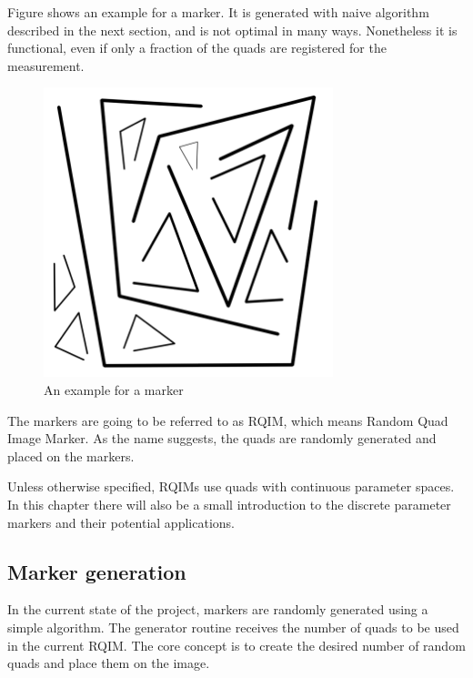 Figure  shows an example for a marker.
It is generated with naive algorithm described in the next section, and is not optimal in many ways.
Nonetheless it is functional, even if only a fraction of the quads are registered for the measurement.
\begin{figure}[ht]
	\centering
	\includegraphics[width=0.75\textwidth]{figures/RQIM_1.png}
	\caption{An example for a marker}
	\label{fig:rqimExample}
\end{figure}

The markers are going to be referred to as RQIM, which means Random Quad Image Marker.
As the name suggests, the quads are randomly generated and placed on the markers.

Unless otherwise specified, RQIMs use quads with continuous parameter spaces.
In this chapter there will also be a small introduction to the discrete parameter markers and their potential applications.

\subsection{Marker generation}

In the current state of the project, markers are randomly generated using a simple algorithm.
The generator routine receives the number of quads to be used in the current RQIM.
The core concept is to create the desired number of random quads and place them on the image.

